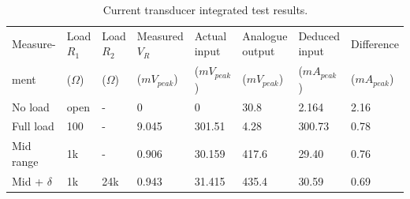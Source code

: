 \begin{table} [h]
        \centering
        \scriptsize
        \caption{Current transducer integrated test results.}
         \begin{tabular}{C{1.4cm} C{1.2cm} C{1.2cm} | C{1.8cm} C{1.8cm} C{2.2cm} C{2cm} C{1.8cm}}
           Measure- & Load $R_1$ & Load $R_2$ & Measured $V_R$ & Actual input & Analogue output & Deduced input & Difference\\
           ment & ($\Omega$) & ($\Omega$) & ($mV_{peak}$) & ($mV_{peak}$) & ($mV_{peak}$) & ($mA_{peak}$) & ($mA_{peak}$) \\
        \hline
            No load      & open & -   & 0      & 0      & 30.8  & 2.164   & 2.16\\
            Full load    & 100  & -   & 9.045       & 301.51 & 4.28  & 300.73  & 0.78\\
            Mid range    & 1k   & -   & 0.906       & 30.159 & 417.6 & 29.40 & 0.76 \\
            Mid + $\delta$    & 1k   & 24k  & 0.943 & 31.415 & 435.4 & 30.59 & 0.69 \\
          \hline
        \end{tabular}
     \label{tab:currenttransducerrealtests}
\end{table}


